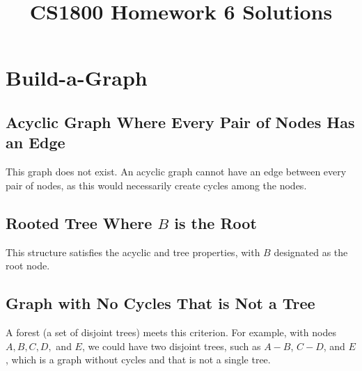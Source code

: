 \documentclass[10pt]{article}
\title{CS1800 Homework 6 Solutions}
\author{}
\date{}
\begin{document}
\maketitle
\newpage

\section{Build-a-Graph}

\subsection{Acyclic Graph Where Every Pair of Nodes Has an Edge}
This graph does not exist. An acyclic graph cannot have an edge between every pair of nodes, as this would necessarily create cycles among the nodes.

\subsection{Rooted Tree Where \( B \) is the Root}
\begin{center}
\end{center}
This structure satisfies the acyclic and tree properties, with \( B \) designated as the root node.

\subsection{Graph with No Cycles That is Not a Tree}
A forest (a set of disjoint trees) meets this criterion. For example, with nodes \( A, B, C, D, \) and \( E \), we could have two disjoint trees, such as \( A - B \), \( C - D \), and \(E\), which is a graph without cycles and that is not a single tree.

\begin{center}
\end{center}
\end{document}
